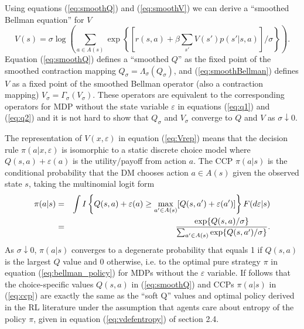 Using equations (\ref{eq:smoothQ}) and (\ref{eq:smoothV}) we can derive a ``smoothed Bellman equation'' for $V$
\begin{equation}
    V(s)= \sigma \log\left(\sum_{a\in A(s)} \exp\left\{[r(s,a)+\beta \sum_{s'} V(s')p(s'|s,a)]/\sigma\right\}\right).
 \label{eq:smoothBellman}
\end{equation}
Equation (\ref{eq:smoothQ}) defines a ``smoothed $Q$'' as the fixed point of the smoothed contraction mapping 
$Q_\sigma=\Lambda_\sigma(Q_\sigma)$, and (\ref{eq:smoothBellman}) defines $V$ as a fixed point of the smoothed 
Bellman operator (also a contraction mapping)
$V_\sigma=\Gamma_\sigma(V_\sigma)$. These operators are equivalent  to the corresponding operators for MDP without the state variable
$\varepsilon$ in equations (\ref{eq:q1}) and (\ref{eq:q2}) and it is not hard to show that $Q_\sigma$ and $V_\sigma$ converge
to $Q$ and $V$ as $\sigma \downarrow 0$. 


The representation of $V(x,\varepsilon)$ in equation (\ref{eq:Vrep}) means that the decision rule $\pi(a|x,\varepsilon)$ 
is isomorphic to a static discrete choice model where $Q(s,a)+\varepsilon(a)$ is the utility/payoff from action $a$.
The CCP $\pi(a|s)$ is the conditional probability that the DM chooses action $a \in A(s)$
given the observed state $s$, taking the multinomial logit form \citep{mcfadden:1973}
\begin{eqnarray}
     \pi(a|s)  & =& \int I\left\{Q(s,a)+\varepsilon(a) \ge \max_{a' \in A(s)}[Q(s,a')+\varepsilon(a')]\right\}F(d\varepsilon|s)\nonumber \\
 &=&{ \exp\{Q(s,a)/\sigma\} \over \sum_{a' \in A(s)} \exp\{Q(s,a')/\sigma\}}.
\label{eq:ccp}
\end{eqnarray}
As $\sigma \downarrow 0$, $\pi(a|s)$ converges to a degenerate probability that equals 1 if 
$Q(s,a)$ is the largest $Q$ value  and 0 otherwise, i.e. to the optimal pure strategy $\pi$
 in equation (\ref{eq:bellman_policy}) for MDPs without the  $\varepsilon$ variable.
If follows that the choice-specific values $Q(s,a)$ in (\ref{eq:smoothQ}) and CCPs $\pi(a|s)$ in (\ref{eq:ccp})
are exactly the same as the ``soft Q'' values and optimal policy derived in the RL
literature under the assumption that agents care about entropy of the policy $\pi$, given in equation
(\ref{eq:vdefentropy}) of section 2.4.

